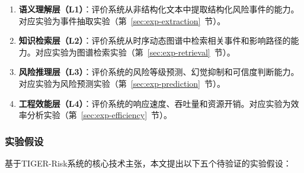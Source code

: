 \documentclass[12pt,a4paper]{article}
\newcommand{\projectshort}{TIGER-Risk}
\newcommand{\term}[1]{\textbf{#1}}
\begin{document}
\begin{enumerate}
    \item \term{语义理解层（L1）}：评价系统从非结构化文本中提取结构化风险事件的能力。对应实验为事件抽取实验（第~\ref{sec:exp-extraction}~节）。
    \item \term{知识检索层（L2）}：评价系统从时序动态图谱中检索相关事件和影响路径的能力。对应实验为图谱检索实验（第~\ref{sec:exp-retrieval}~节）。
    \item \term{风险推理层（L3）}：评价系统的风险等级预测、幻觉抑制和可信度判断能力。对应实验为风险预测实验（第~\ref{sec:exp-prediction}~节）。
    \item \term{工程效能层（L4）}：评价系统的响应速度、吞吐量和资源开销。对应实验为效率分析实验（第~\ref{sec:exp-efficiency}~节）。
\end{enumerate}

\subsubsection{实验假设}

基于\projectshort 系统的核心技术主张，本文提出以下五个待验证的实验假设：
\end{document}
